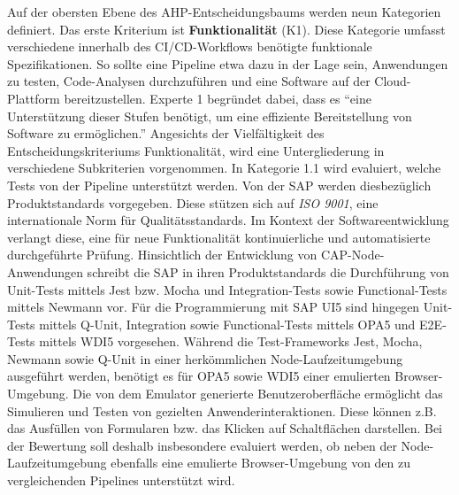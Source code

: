  Auf der obersten Ebene des AHP-Entscheidungsbaums werden neun Kategorien definiert. Das erste Kriterium ist \textbf{Funktionalität} (K1). Diese Kategorie umfasst verschiedene innerhalb des CI/CD-Workflows benötigte funktionale Spezifikationen. So sollte eine Pipeline etwa dazu in der Lage sein, Anwendungen zu testen, Code-Analysen durchzuführen und eine Software auf der Cloud-Plattform bereitzustellen. Experte 1 begründet dabei, dass es \enquote{eine Unterstützung dieser Stufen benötigt, um eine effiziente Bereitstellung von Software zu ermöglichen.} Angesichts der Vielfältigkeit des Entscheidungskriteriums Funktionalität, wird eine Untergliederung in verschiedene Subkriterien vorgenommen. In Kategorie 1.1 wird evaluiert, welche Tests von der Pipeline unterstützt werden. Von der SAP werden diesbezüglich Produktstandards vorgegeben. Diese stützen sich auf \textit{ISO 9001}, eine internationale Norm für Qualitätsstandards. Im Kontext der Softwareentwicklung verlangt diese, eine für neue Funktionalität kontinuierliche und automatisierte durchgeführte Prüfung. Hinsichtlich der Entwicklung von CAP-Node-Anwendungen schreibt die SAP in ihren Produktstandards die Durchführung von Unit-Tests mittels Jest bzw. Mocha und Integration-Tests sowie Functional-Tests mittels Newmann vor. Für die Programmierung mit SAP UI5 sind hingegen Unit-Tests mittels Q-Unit, Integration sowie Functional-Tests mittels OPA5 und E2E-Tests mittels WDI5 vorgesehen. Während die Test-Frameworks Jest, Mocha, Newmann sowie Q-Unit in einer herkömmlichen Node-Laufzeitumgebung ausgeführt werden, benötigt es für OPA5 sowie WDI5 einer emulierten Browser-Umgebung. Die von dem Emulator generierte Benutzeroberfläche ermöglicht das Simulieren und Testen von gezielten Anwenderinteraktionen. Diese können z.B. das Ausfüllen von Formularen bzw. das Klicken auf Schaltflächen darstellen. Bei der Bewertung soll deshalb insbesondere evaluiert werden, ob neben der Node-Laufzeitumgebung ebenfalls eine emulierte Browser-Umgebung von den zu vergleichenden Pipelines unterstützt wird.\\ 
